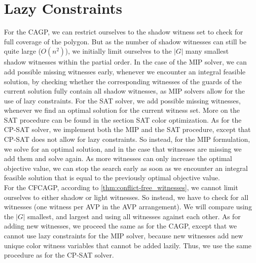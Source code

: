 \section{Lazy Constraints}
For the CAGP, we can restrict ourselves to the shadow witness set to check for full coverage of the polygon. But as the number of shadow witnesses can still be quite large ($O(n^2)$), we initially limit ourselves to the $|G|$ many smallest shadow witnesses within the partial order. In the case of the MIP solver, we can add possible missing witnesses early, whenever we encounter an integral feasible solution, by checking whether the corresponding witnesses of the guards of the current solution fully contain all shadow witnesses, as MIP solvers allow for the use of lazy constraints. For the SAT solver, we add possible missing witnesses, whenever we find an optimal solution for the current witness set. More on the SAT procedure can be found in the section SAT color optimization. As for the CP-SAT solver, we implement both the MIP and the SAT procedure, except that CP-SAT does not allow for lazy constraints. So instead, for the MIP formulation, we solve for an optimal solution, and in the case that witnesses are missing we add them and solve again. As more witnesses can only increase the optimal objective value, we can stop the search early as soon as we encounter an integral feasible solution that is equal to the previously optimal objective value.\\
For the CFCAGP, according to \cref{thm:conflict-free_witnesses}, we cannot limit ourselves to either shadow or light witnesses. So instead, we have to check for all witnesses (one witness per AVP in the AVP arrangement). We will compare using the $|G|$ smallest, and largest and using all witnesses against each other. As for adding new witnesses, we proceed the same as for the CAGP, except that we cannot use lazy constraints for the MIP solver, because new witnesses add new unique color witness variables that cannot be added lazily. Thus, we use the same procedure as for the CP-SAT solver.

